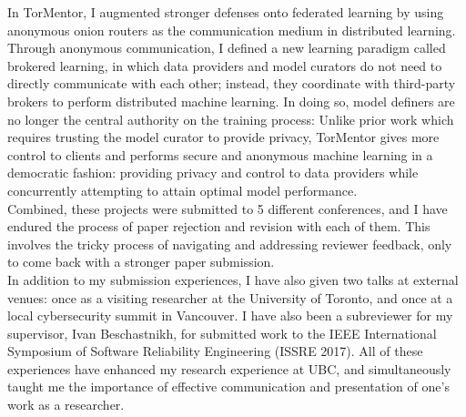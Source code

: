 \documentclass[10pt]{article} %
\begin{document}
In TorMentor, I augmented stronger defenses onto federated learning by using anonymous onion routers as the communication medium in distributed learning. Through anonymous communication, I defined a new learning paradigm called brokered learning, in which data providers and model curators do not need to directly communicate with each other; instead, they coordinate with third-party brokers to perform distributed machine learning. In doing so, model definers are no longer the central authority on the training process: Unlike prior work which requires trusting the model curator to provide privacy, TorMentor gives more control to clients and performs secure and anonymous machine learning in a democratic fashion: providing privacy and control to data providers while concurrently attempting to attain optimal model performance. \\

Combined, these projects were submitted to 5 different conferences, and I have endured the process of paper rejection and revision with each of them. This involves the tricky process of navigating and addressing reviewer feedback, only to come back with a stronger paper submission. \\

In addition to my submission experiences, I have also given two talks at external venues: once as a visiting researcher at the University of Toronto, and once at a local cybersecurity summit in Vancouver. I have also been a subreviewer for my supervisor, Ivan Beschastnikh, for submitted work to the IEEE International Symposium of Software Reliability Engineering (ISSRE 2017). All of these experiences have enhanced my research experience at UBC, and simultaneously taught me the importance of effective communication and presentation of one's work as a researcher. 
\end{document}

